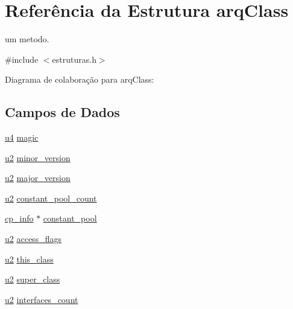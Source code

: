 \hypertarget{structarq_class}{}\section{Referência da Estrutura arq\+Class}
\label{structarq_class}


um metodo.  




{\ttfamily \#include $<$estruturas.\+h$>$}



Diagrama de colaboração para arq\+Class\+:
\subsection*{Campos de Dados}
\begin{DoxyCompactItemize}
\item 
\hyperlink{estruturas_8h_aedf6ddc03df8caaaccbb4c60b9a9b850}{u4} \hyperlink{structarq_class_af2bde90f63d048e444c9437063394b4f}{magic}
\item 
\hyperlink{estruturas_8h_a5f223212eef04d10a4550ded680cb1cf}{u2} \hyperlink{structarq_class_a90b447e4eea035e1dd5fb45360a6a09f}{minor\+\_\+version}
\item 
\hyperlink{estruturas_8h_a5f223212eef04d10a4550ded680cb1cf}{u2} \hyperlink{structarq_class_a0aeda33023ba35d892279365630779d3}{major\+\_\+version}
\item 
\hyperlink{estruturas_8h_a5f223212eef04d10a4550ded680cb1cf}{u2} \hyperlink{structarq_class_a42ffae9572594b9a62b2e8af085a4b69}{constant\+\_\+pool\+\_\+count}
\item 
\hyperlink{estruturas_8h_aafdf80b0992e652420382fcf19b9d074}{cp\+\_\+info} $\ast$ \hyperlink{structarq_class_acf360846d7875335092462ec84c5d130}{constant\+\_\+pool}
\item 
\hyperlink{estruturas_8h_a5f223212eef04d10a4550ded680cb1cf}{u2} \hyperlink{structarq_class_a2d74614ed3f671871c0385e5233a8250}{access\+\_\+flags}
\item 
\hyperlink{estruturas_8h_a5f223212eef04d10a4550ded680cb1cf}{u2} \hyperlink{structarq_class_a0fa1b4b35fcc35e25fff7563f1ce7b2b}{this\+\_\+class}
\item 
\hyperlink{estruturas_8h_a5f223212eef04d10a4550ded680cb1cf}{u2} \hyperlink{structarq_class_a7bd81d496166908031c40895ed667ada}{super\+\_\+class}
\item 
\hyperlink{estruturas_8h_a5f223212eef04d10a4550ded680cb1cf}{u2} \hyperlink{structarq_class_a1e2038132261e59417016cd623005f56}{interfaces\+\_\+count}

\end{DoxyCompactItemize}
